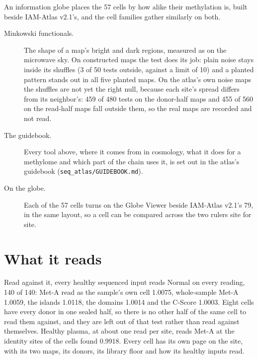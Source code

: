 An information globe places the 57 cells by how alike their methylation is, built beside IAM-Atlas v2.1's, and the cell families gather similarly on both.
\begin{description}
\item[Minkowski functionals.] The shape of a map's bright and dark regions, measured as on the microwave sky. On constructed maps the test does its job: plain noise stays inside its shuffles (3 of 50 tests outside, against a limit of 10) and a planted pattern stands out in all five planted maps. On the atlas's own noise maps the shuffles are not yet the right null, because each site's spread differs from its neighbor's: 459 of 480 tests on the donor-half maps and 455 of 560 on the read-half maps fall outside them, so the real maps are recorded and not read.
\item[The guidebook.] Every tool above, where it comes from in cosmology, what it does for a methylome and which part of the chain uses it, is set out in the atlas's guidebook (\texttt{seq\_atlas/GUIDEBOOK.md}).
\item[On the globe.] Each of the 57 cells turns on the Globe Viewer beside IAM-Atlas v2.1's 79, in the same layout, so a cell can be compared across the two rulers site for site.
\end{description}

\section{What it reads}\label{sec:seqatlas:healthy}

Read against it, every healthy sequenced input reads Normal on every reading, 140 of 140: Met-A read as the sample's own cell 1.0075, whole-sample Met-A 1.0059, the islands 1.0118, the domains 1.0014 and the C-Score 1.0003. Eight cells have every donor in one sealed half, so there is no other half of the same cell to read them against, and they are left out of that test rather than read against themselves. Healthy plasma, at about one read per site, reads Met-A at the identity sites of the cells found 0.9918. Every cell has its own page on the site, with its two maps, its donors, its library floor and how its healthy inputs read.


